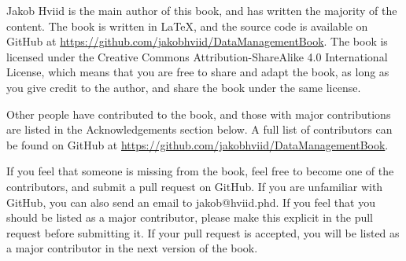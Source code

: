 

\renewcommand{\dropchapter}[1]{
  \renewcommand{\chapterheadstartvskip}{\vspace{#1}}
}

\dropchapter{2.5cm}

\setlength\epigraphwidth{7cm}


Jakob Hviid is the main author of this book, and has written the majority of the content. The book is written in \LaTeX, and the source code is available on GitHub at \url{https://github.com/jakobhviid/DataManagementBook}. The book is licensed under the Creative Commons Attribution-ShareAlike 4.0 International License, which means that you are free to share and adapt the book, as long as you give credit to the author, and share the book under the same license.

Other people have contributed to the book, and those with major contributions are listed in the Acknowledgements section below. A full list of contributors can be found on GitHub at \url{https://github.com/jakobhviid/DataManagementBook}. 

If you feel that someone is missing from the book, feel free to become one of the contributors, and submit a pull request on GitHub. If you are unfamiliar with GitHub, you can also send an email to jakob@hviid.phd. If you feel that you should be listed as a major contributor, please make this explicit in the pull request before submitting it. If your pull request is accepted, you will be listed as a major contributor in the next version of the book.
